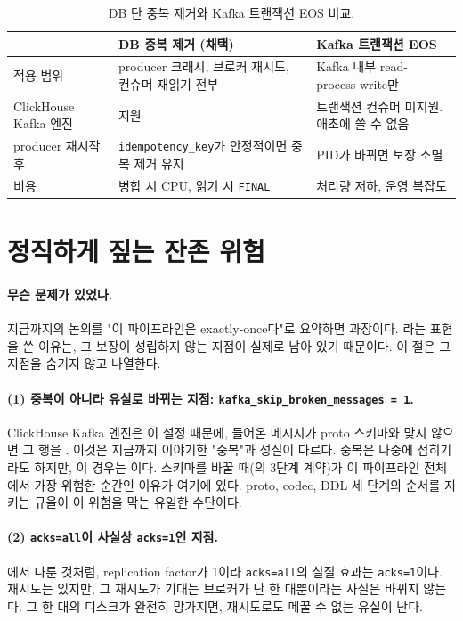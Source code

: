\begin{table}[htbp]
  \centering
  \small
  \begin{tabularx}{\linewidth}{@{}lXX@{}}
    \toprule
     & DB 중복 제거 (채택) & Kafka 트랜잭션 EOS \\
    \midrule
    적용 범위 & producer 크래시, 브로커 재시도, 컨슈머 재읽기 전부 & Kafka 내부
      read-process-write만 \\
    ClickHouse Kafka 엔진 & 지원 & 트랜잭션 컨슈머 미지원. 애초에 쓸 수 없음 \\
    producer 재시작 후 & \texttt{idempotency\_key}가 안정적이면 중복 제거 유지 &
      PID가 바뀌면 보장 소멸 \\
    비용 & 병합 시 CPU, 읽기 시 \texttt{FINAL} & 처리량 저하, 운영 복잡도 \\
    \bottomrule
  \end{tabularx}
  \caption{DB 단 중복 제거와 Kafka 트랜잭션 EOS 비교.}
  \label{tab:delivery-eos-vs-dedup}
\end{table}

\section{정직하게 짚는 잔존 위험}
\label{sec:delivery-honest}

\paragraph{무슨 문제가 있었나.} 지금까지의 논의를 "이 파이프라인은 exactly-once다"로
요약하면 과장이다. 라는 표현을 쓴 이유는, 그 보장이
성립하지 않는 지점이 실제로 남아 있기 때문이다. 이 절은 그 지점을 숨기지 않고
나열한다.

\paragraph{(1) 중복이 아니라 유실로 바뀌는 지점: \texttt{kafka\_skip\_broken\_messages
= 1}.} ClickHouse Kafka 엔진은 이 설정 때문에, 들어온 메시지가 proto 스키마와 맞지
않으면 그 행을 . 이것은 지금까지 이야기한 "중복"과 성질이 다르다.
중복은 나중에 접히기라도 하지만, 이 경우는 이다. 스키마를 바꿀
때(의 3단계 계약)가 이 파이프라인 전체에서 가장 위험한 순간인
이유가 여기에 있다. proto, codec, DDL 세 단계의 순서를 지키는 규율이 이 위험을 막는
유일한 수단이다.

\paragraph{(2) \texttt{acks=all}이 사실상 \texttt{acks=1}인 지점.}
에서 다룬 것처럼, replication factor가 1이라
\texttt{acks=all}의 실질 효과는 \texttt{acks=1}이다. 재시도는 있지만, 그 재시도가
기대는 브로커가 단 한 대뿐이라는 사실은 바뀌지 않는다. 그 한 대의 디스크가 완전히
망가지면, 재시도로도 메꿀 수 없는 유실이 난다.

